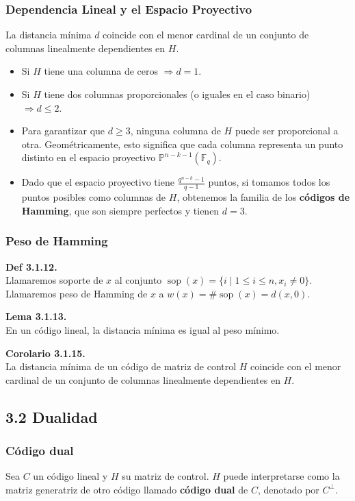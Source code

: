 \documentclass{article}
\begin{document}
\subsubsection{Dependencia Lineal y el Espacio Proyectivo}
La distancia mínima $d$ coincide con el menor cardinal de un conjunto de columnas linealmente dependientes en $H$.

\begin{itemize}
\item Si $H$ tiene una columna de ceros $\Rightarrow d = 1$.
\item Si $H$ tiene dos columnas proporcionales (o iguales en el caso binario) $\Rightarrow d \le 2$.
\item Para garantizar que $d \ge 3$, ninguna columna de $H$ puede ser proporcional a otra. Geométricamente, esto significa que cada columna representa un punto distinto en el espacio proyectivo $\mathbb{P}^{n-k-1}(\mathbb{F}_q)$.
\item Dado que el espacio proyectivo tiene $\frac{q^{n-k}-1}{q-1}$ puntos, si tomamos todos los puntos posibles como columnas de $H$, obtenemos la familia de los \textbf{códigos de Hamming}, que son siempre perfectos y tienen $d=3$.
\end{itemize}

\subsubsection{Peso de Hamming}

\textbf{Def 3.1.12.} \\
Llamaremos soporte de $x$ al conjunto $\operatorname{sop}(x)=\{i \mid 1 \le i \le n, x_{i} \ne 0\}$. Llamaremos peso de Hamming de $x$ a $w(x) = \#\operatorname{sop}(x) = d(x, 0)$.

\textbf{Lema 3.1.13.}\\
En un código lineal, la distancia mínima es igual al peso mínimo.

\textbf{Corolario 3.1.15.} \\
La distancia mínima de un código de matriz de control $H$ coincide con el menor cardinal de un conjunto de columnas linealmente dependientes en $H$.

\subsection{3.2 Dualidad}
\subsubsection{Código dual}
Sea $C$ un código lineal y $H$ su matriz de control. $H$ puede interpretarse como la matriz generatriz de otro código llamado \textbf{código dual} de $C$, denotado por $C^{\perp}$.
\end{document}
